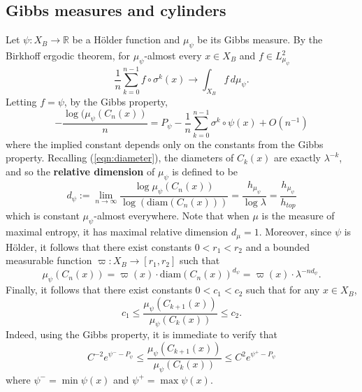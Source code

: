 \documentclass[12pt]{amsart}
\theoremstyle{plain}
\theoremstyle{definition}
\begin{document}
\subsection{Gibbs measures and cylinders}
\label{subsec:gibbsCyl}
Let $\psi:X_B\rightarrow \mathbb{R}$ be a H\"older function and $\mu_{\psi}$ be its Gibbs measure. By the Birkhoff ergodic theorem, for $\mu_{\psi}$-almost every $x\in X_B$ and $f\in L^2_{\mu_\psi}$
$$\frac1n \sum_{k=0}^{n-1} f \circ \sigma^k(x)\longrightarrow \int_{X_B}f\, d\mu_\psi.$$
Letting $f = \psi$, by the Gibbs property,
$$\displaystyle -\frac{\log(\mu_\psi(C_n(x))}{n} = P_\psi - \frac1n \sum_{k=0}^{n-1}\sigma^k\circ \psi (x) + O(n^{-1})$$
where the implied constant depends only on the constants from the Gibbs property. Recalling (\ref{eqn:diameter}), the diameters of $C_k(x)$ are exactly $\lambda^{-k}$, and so the \textbf{relative dimension} of $\mu_\psi$ is defined to be
$$d_\psi:=\lim_{n\rightarrow \infty}\frac{\log \mu_{\psi}(C_n(x))}{\log(\mathrm{diam}(C_n(x)))} = \frac{h_{\mu_\psi}}{\log \lambda} = \frac{h_{\mu_\psi}}{h_{top}}$$
which is constant $\mu_\psi$-almost everywhere. Note that when $\mu$ is the measure of maximal entropy, it has maximal relative dimension $d_\mu = 1$. Moreover, since $\psi$ is H\"older, it follows that there exist constants $0<r_1<r_2$ and a bounded measurable function $\varpi:X_B\rightarrow [r_1,r_2]$ such that 
\begin{equation}
\label{eqn:distort}
\mu_\psi(C_n(x)) = \varpi(x) \cdot \mathrm{diam}(C_n(x))^{d_\psi} = \varpi(x)\cdot \lambda^{-nd_\psi}.
\end{equation}
Finally, it follows that there exist constants $0<c_1<c_2$ such that for any $x\in X_B$,
\begin{equation}
\label{eqn:childBound}
c_1\leq \frac{\mu_\psi(C_{k+1}(x))}{\mu_\psi(C_k(x))}\leq c_2.
\end{equation}
Indeed, using the Gibbs property, it is immediate to verify that
$$C^{-2} e^{\psi^- - P_\psi }\leq \frac{\mu_\psi(C_{k+1}(x))}{\mu_\psi(C_k(x))}\leq C^{2} e^{\psi^+ - P_\psi }$$
where $\psi^- = \min \psi(x)$ and $\psi^+ = \max \psi(x)$.
\end{document}
